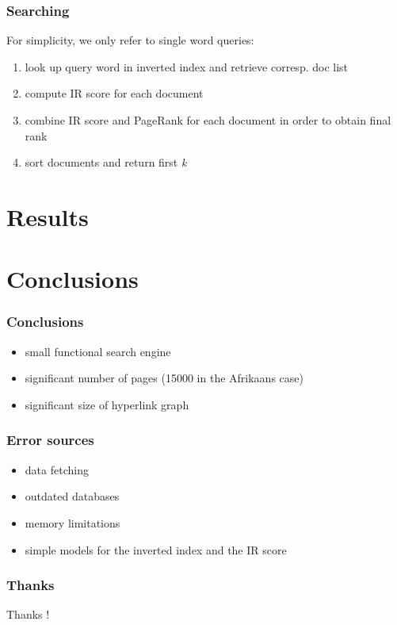\documentclass[10pt]{beamer}
\begin{document}
\begin{frame}
\frametitle{Searching}

For simplicity, we only refer to single word queries:
\begin{enumerate}
\item look up query word in inverted index and retrieve corresp. doc list
\item compute IR score for each document
\item combine IR score and PageRank for each document in order to obtain final rank
\item sort documents and return first \emph{k}
\end{enumerate}
\end{frame}






\section{Results}



\section{Conclusions}
\begin{frame}
\frametitle{Conclusions}

\begin{itemize}
\item small functional search engine
\item significant number of pages (15000 in the Afrikaans case)
\item significant size of hyperlink graph
\end{itemize}
\end{frame}

\begin{frame}
\frametitle{Error sources}
\begin{itemize}
\item data fetching
\item outdated databases
\item memory limitations
\item simple models for the inverted index and the IR score
\end{itemize}
\end{frame}

\begin{frame}
  \frametitle{Thanks}
  \begin{center}
    \huge{Thanks !}
  \end{center}
\end{frame}
\end{document}
